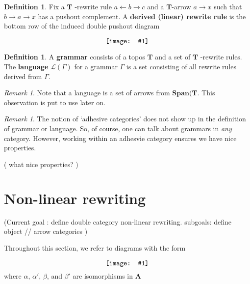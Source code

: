 \documentclass{amsart}
\newcommand{\A}{\cat{A}}
\newcommand{\defn}[1]{\textbf{#1}}
\newcommand{\cat}[1]{\mathbf{#1}}
\newcommand{\diagram}[1]{\raisebox{-0.5\height}{\texttt{[image: \#1]}}}
\newcommand{\Span}{\mathbf{Span}}
\newcommand{\edit}[1]{\textcolor{editcolour}{(#1)}}
\theoremstyle{remark}
\newtheorem{remark}[theorem]{Remark}
\theoremstyle{definition}
\newtheorem{definition}[theorem]{Definition}
\begin{document}
\begin{definition} \label{df:dpo_derived-rewrite-rule} 
  Fix a \( \cat{T} \) -rewrite rule \( a \gets b \to c \) and a
  $ \cat{T} $-arrow $ a \to x $ such that $ b \to a \to x $ has a 
  pushout complement. A \defn{derived (linear) rewrite rule} is the
  bottom row of the induced double pushout diagram 
  \[ 
    \diagram{diag_rw_derived-rule}
  \]
\end{definition}

\begin{definition} \label{df:dpo_grammar}
  A \defn{ grammar } consists of a topos \( \cat{T} \) and a set of
  \( \cat{T} \) -rewrite rules. The \textbf{language}
  \( \mathcal{L} ( \Gamma ) \) for a grammar \( \Gamma \) is a set
  consisting of all rewrite rules derived from \( \Gamma \).
\end{definition}

\begin{remark}
  Note that a language is a set of arrows from \( \Span ( \cat{T}
  \). This observation is put to use later on.   
\end{remark}

\begin{remark}
  The notion of `adhesive categories' does not show up in the
  definition of grammar or language.  So, of course, one can talk
  about grammars in \emph{any} category.  However, working within an
  adhesvie category ensures we have nice properties.

  \edit{ what nice properties? } 
\end{remark}


\section{Non-linear rewriting}
\label{sec:non-linear-rewriting}

\edit{Current goal : define double category non-linear
  rewriting. subgoals: define object // arrow categories }

Throughout this section, we refer to diagrams with the form
\begin{equation}
  \label{eq:nlr-2cell-form}
  \diagram{diag_nlr_dbl-rewrite-2cell}
\end{equation}
where $ \alpha $, $ \alpha' $, $ \beta $, and $ \beta' $ are isomorphisms in $ \A $
\end{document}
